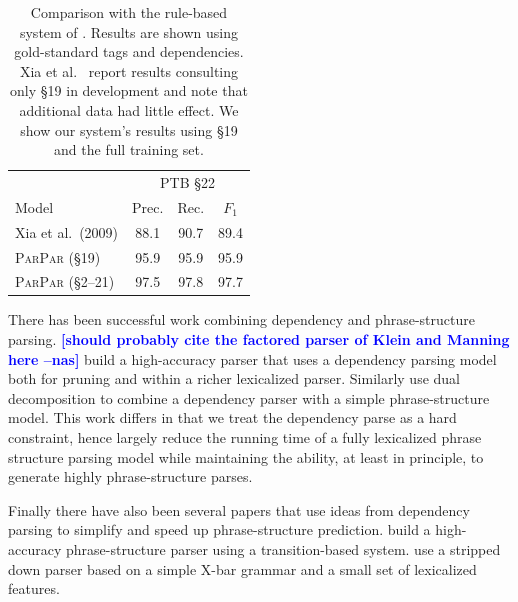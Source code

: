 \documentclass[11pt,letterpaper]{article}
\newcommand{\ParseName}{\textsc{ParPar}\xspace}
\newcommand{\nascomment}[1]{\textcolor{blue}{\bf \small [#1 --nas]}}
\begin{document}
\begin{table}
  \centering
  \small
  \begin{tabular}{|l|ccc|}

    \hline
    & \multicolumn{3}{|c|}{PTB \S 22} \\
    Model & Prec. & Rec. & $F_1$  \\
    \hline

    \hline
    Xia et al.~(2009)    & 88.1 & 90.7 & 89.4 \\
    \ParseName{} (\S 19)  & 95.9 & 95.9 & 95.9    \\
    \ParseName{}  (\S 2--21) & 97.5 & 97.8 & 97.7    \\
    \hline

  \end{tabular}
  \caption{Comparison with the rule-based system of .
    Results are shown using gold-standard tags and
    dependencies.  Xia et al.~
 report results consulting only \S 19 in development and
note that additional data had little effect.  We show our system's
results using \S 19 and the full training set. 
  \label{tab:convert}}
\end{table}



There has been successful work combining dependency and
phrase-structure parsing. 
\nascomment{should probably cite the factored parser of Klein and
  Manning here}
 build a
high-accuracy parser that uses a dependency parsing model both for
pruning and within a richer lexicalized parser. Similarly
 use dual decomposition to combine a dependency
parser with a simple phrase-structure model. This work differs
in that we treat the dependency parse as a hard constraint, hence largely reduce the
running time of a fully lexicalized phrase structure parsing model
while maintaining the ability, at least in principle,
to generate highly phrase-structure parses. 




Finally there have also been several papers that use ideas from
dependency parsing to simplify and speed up phrase-structure prediction.
 build a high-accuracy phrase-structure parser
using a transition-based system.  use a stripped
down parser based on a simple X-bar grammar and a small set of lexicalized features.
\end{document}
